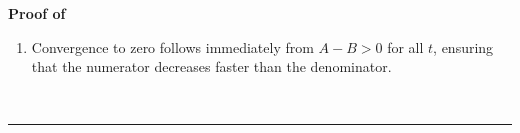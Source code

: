 \documentclass[12pt]{article}
\newenvironment{proof}[1][Proof of]{\noindent\textbf{#1} }{\ \rule{0.5em}{0.5em}}
\begin{document}
\begin{proof}
\begin{enumerate}[label={\roman*})]
\item Convergence to zero follows immediately from $A-B>0$ for all $t$, ensuring that the numerator decreases faster than the denominator.



\end{enumerate}
\end{proof}
\end{document}
